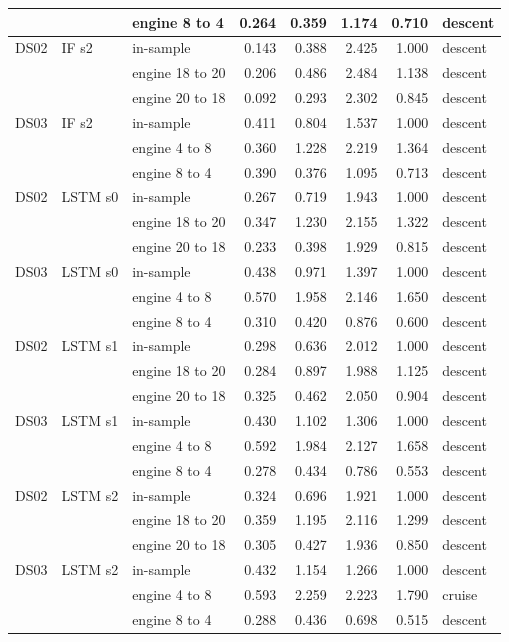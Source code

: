 \begin{scriptsize}
\begin{longtable}{lllrrrrl}
 &  & engine 8 to 4 & 0.264 & 0.359 & 1.174 & 0.710 & descent \\
\midrule
DS02 & IF s2 & in-sample & 0.143 & 0.388 & 2.425 & 1.000 & descent \\
 &  & engine 18 to 20 & 0.206 & 0.486 & 2.484 & 1.138 & descent \\
 &  & engine 20 to 18 & 0.092 & 0.293 & 2.302 & 0.845 & descent \\
\midrule
DS03 & IF s2 & in-sample & 0.411 & 0.804 & 1.537 & 1.000 & descent \\
 &  & engine 4 to 8 & 0.360 & 1.228 & 2.219 & 1.364 & descent \\
 &  & engine 8 to 4 & 0.390 & 0.376 & 1.095 & 0.713 & descent \\
\midrule
DS02 & LSTM s0 & in-sample & 0.267 & 0.719 & 1.943 & 1.000 & descent \\
 &  & engine 18 to 20 & 0.347 & 1.230 & 2.155 & 1.322 & descent \\
 &  & engine 20 to 18 & 0.233 & 0.398 & 1.929 & 0.815 & descent \\
\midrule
DS03 & LSTM s0 & in-sample & 0.438 & 0.971 & 1.397 & 1.000 & descent \\
 &  & engine 4 to 8 & 0.570 & 1.958 & 2.146 & 1.650 & descent \\
 &  & engine 8 to 4 & 0.310 & 0.420 & 0.876 & 0.600 & descent \\
\midrule
DS02 & LSTM s1 & in-sample & 0.298 & 0.636 & 2.012 & 1.000 & descent \\
 &  & engine 18 to 20 & 0.284 & 0.897 & 1.988 & 1.125 & descent \\
 &  & engine 20 to 18 & 0.325 & 0.462 & 2.050 & 0.904 & descent \\
\midrule
DS03 & LSTM s1 & in-sample & 0.430 & 1.102 & 1.306 & 1.000 & descent \\
 &  & engine 4 to 8 & 0.592 & 1.984 & 2.127 & 1.658 & descent \\
 &  & engine 8 to 4 & 0.278 & 0.434 & 0.786 & 0.553 & descent \\
\midrule
DS02 & LSTM s2 & in-sample & 0.324 & 0.696 & 1.921 & 1.000 & descent \\
 &  & engine 18 to 20 & 0.359 & 1.195 & 2.116 & 1.299 & descent \\
 &  & engine 20 to 18 & 0.305 & 0.427 & 1.936 & 0.850 & descent \\
\midrule
DS03 & LSTM s2 & in-sample & 0.432 & 1.154 & 1.266 & 1.000 & descent \\
 &  & engine 4 to 8 & 0.593 & 2.259 & 2.223 & 1.790 & cruise \\
 &  & engine 8 to 4 & 0.288 & 0.436 & 0.698 & 0.515 & descent \\
\end{longtable}
\end{scriptsize}
